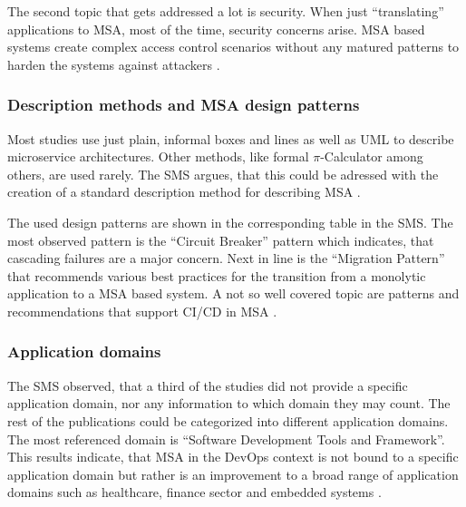 The second topic that gets addressed a lot is security. When just ``translating''
applications to MSA, most of the time, security concerns arise. MSA based systems
create complex access control scenarios without any matured patterns to harden
the systems against attackers \cite{waseem:SMSMSADevOps}.

\subsubsection{Description methods and MSA design patterns}

Most studies use just plain, informal boxes and lines as well as UML to
describe microservice architectures. Other methods, like formal $\pi$-Calculator
among others, are used rarely. The SMS argues, that this could be adressed with
the creation of a standard description method for describing MSA
\cite{waseem:SMSMSADevOps}.

The used design patterns are shown in the corresponding table in the SMS.
The most observed pattern is the ``Circuit Breaker'' pattern which indicates,
that cascading failures are a major concern. Next in line is the ``Migration
Pattern'' that recommends various best practices for the transition from
a monolytic application to a MSA based system.
A not so well covered topic are patterns and recommendations
that support CI/CD in MSA \cite{waseem:SMSMSADevOps}.

\subsubsection{Application domains}

The SMS observed, that a third of the studies did not provide a specific application
domain, nor any information to which domain they may count. The rest of the publications
could be categorized into different application domains. The most referenced domain
is ``Software Development Tools and Framework''. This results indicate, that MSA
in the DevOps context is not bound to a specific application domain but rather is
an improvement to a broad range of application domains such as healthcare, finance sector
and embedded systems \cite{waseem:SMSMSADevOps}.
